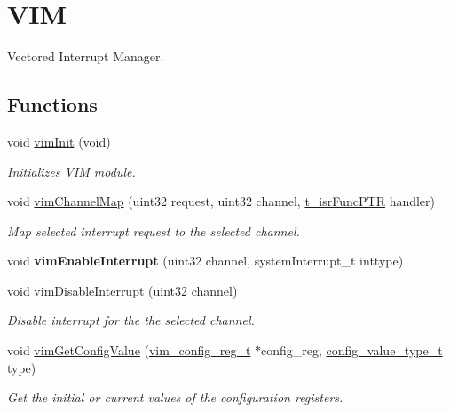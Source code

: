 \hypertarget{group__VIM}{}\section{V\+IM}
\label{group__VIM}


Vectored Interrupt Manager.  


\subsection*{Functions}
\begin{DoxyCompactItemize}
\item 
void \mbox{\hyperlink{group__VIM_ga894b6f212b72787bfa97f1ac62877167}{vim\+Init}} (void)
\begin{DoxyCompactList}\small\item\em Initializes V\+IM module. \end{DoxyCompactList}\item 
void \mbox{\hyperlink{group__VIM_ga1a269c8383f7cbf75df048bb812307bb}{vim\+Channel\+Map}} (uint32 request, uint32 channel, \mbox{\hyperlink{sys__vim_8h_a081e608fbf0927e18d08a4d8a96bf06a}{t\+\_\+isr\+Func\+P\+TR}} handler)
\begin{DoxyCompactList}\small\item\em Map selected interrupt request to the selected channel. \end{DoxyCompactList}\item 
\mbox{\label{group__VIM_gadcc56ba4e8e75c39f782b78f4022bf7a}} 
void {\bfseries vim\+Enable\+Interrupt} (uint32 channel, system\+Interrupt\+\_\+t inttype)
\item 
void \mbox{\hyperlink{group__VIM_gac4c74a2a1d17f9c7ec4cc3ba156a230e}{vim\+Disable\+Interrupt}} (uint32 channel)
\begin{DoxyCompactList}\small\item\em Disable interrupt for the the selected channel. \end{DoxyCompactList}\item 
void \mbox{\hyperlink{group__VIM_gae8b4aff17dfb436d01775ae6fce955c1}{vim\+Get\+Config\+Value}} (\mbox{\hyperlink{structvim__config__reg}{vim\+\_\+config\+\_\+reg\+\_\+t}} $\ast$config\+\_\+reg, \mbox{\hyperlink{sys__common_8h_a9daf9a5992391b058477d28d107ee5e2}{config\+\_\+value\+\_\+type\+\_\+t}} type)
\begin{DoxyCompactList}\small\item\em Get the initial or current values of the configuration registers. \end{DoxyCompactList}\end{DoxyCompactItemize}


